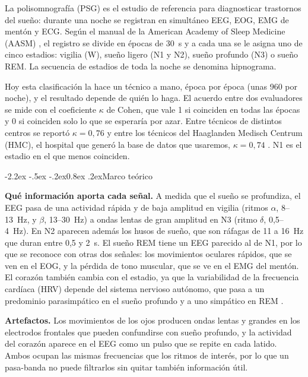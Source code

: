 \documentclass[11pt,a4paper]{article}
\makeatletter
\renewcommand\subsection{\@startsection{subsection}{2}{\z@}%
  {-2.2ex \@plus -.5ex \@minus -.2ex}{0.8ex \@plus .2ex}{\normalfont\normalsize\bfseries}}
\makeatother
\begin{document}
La polisomnografía (PSG) es el estudio de referencia para diagnosticar
trastornos del sueño: durante una noche se registran en simultáneo EEG,
EOG, EMG de mentón y ECG. Según el
manual de la American Academy of Sleep Medicine (AASM) \cite{aasm}, el
registro se divide en épocas de 30~s y a cada una se le asigna uno de
cinco estadios: vigilia (W), sueño ligero (N1 y N2), sueño profundo (N3)
o sueño REM. La secuencia de estadios de toda la noche se denomina
hipnograma.

Hoy esta clasificación la hace un técnico a mano, época por época (unas
960 por noche), y el resultado depende de quién lo haga. El acuerdo entre dos evaluadores se
mide con el coeficiente $\kappa$ de Cohen, que vale 1 si coinciden en
todas las épocas y 0 si coinciden solo lo que se esperaría por azar.
Entre técnicos de distintos centros se reportó $\kappa = 0{,}76$
\cite{danker} y entre los técnicos del Haaglanden Medisch Centrum (HMC),
el hospital que generó la base de datos que usaremos, $\kappa = 0{,}74$
\cite{alvarez}. N1 es el estadio en el que menos coinciden.

\subsection{Marco teórico}

\textbf{Qué información aporta cada señal.} A medida que el sueño se
profundiza, el EEG pasa de una actividad rápida y de baja amplitud en
vigilia (ritmos $\alpha$, 8--13~Hz, y $\beta$, 13--30~Hz) a ondas lentas
de gran amplitud en N3 (ritmo $\delta$, 0,5--4~Hz). En N2 aparecen
además los husos de sueño, que son ráfagas de 11 a 16~Hz que duran entre 0,5 y
2~s. El sueño REM tiene un EEG parecido al de N1, por lo que se
reconoce con otras dos señales: los movimientos oculares rápidos, que se
ven en el EOG, y la pérdida de tono muscular, que se ve en el EMG del
mentón. El corazón también cambia con el estadio, ya que la variabilidad de la
frecuencia cardíaca (HRV) depende del sistema nervioso autónomo, que pasa a un predominio
parasimpático en el sueño profundo y a uno simpático en REM \cite{trinder}.

\textbf{Artefactos.} Los movimientos de los ojos producen ondas lentas y grandes en los
electrodos frontales que pueden confundirse con
sueño profundo, y la actividad del corazón aparece en el EEG como un
pulso que se repite en cada latido. Ambos ocupan las mismas frecuencias
que los ritmos de interés, por lo que un pasa-banda no puede filtrarlos
sin quitar también información útil.
\end{document}
